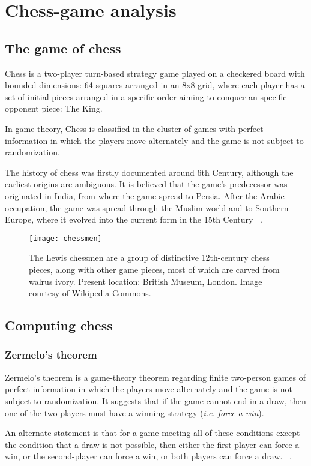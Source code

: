\chapter{Chess-game analysis}

\section{The game of chess}

Chess is a two-player turn-based strategy game played on a checkered board with bounded dimensions: 64 squares arranged in an 8x8 grid, where each player has a set of initial pieces arranged in a specific order aiming to conquer an specific opponent piece: The King.

In game-theory, Chess is classified in the cluster of games with perfect information in which the players move alternately and the game is not subject to randomization.

The history of chess was firstly documented around 6th Century, although the earliest origins are ambiguous. It is believed that the game's predecessor was originated in India, from where the game spread to Persia. After the Arabic occupation, the game was spread through the Muslim world and to Southern Europe, where it evolved into the current form in the 15th Century ~\cite{murray1913history}.


    \begin{figure}[H]
        \centering
        \texttt{[image: chessmen]}
        \caption{The Lewis chessmen are a group of distinctive 12th-century chess pieces, along with other game pieces, most of which are carved from walrus ivory. Present location: British Museum, London. Image courtesy of Wikipedia Commons.}
    \end{figure}

\section{Computing chess}

\subsection{Zermelo's theorem}

\begin{theorem} 
Zermelo's theorem is a game-theory theorem regarding finite two-person games of perfect information in which the players move alternately and the game is not subject to randomization. It suggests that if the game cannot end in a draw, then one of the two players must have a winning strategy (\textit{i.e. force a win}). 

An alternate statement is that for a game meeting all of these conditions except the condition that a draw is not possible, then either the first-player can force a win, or the second-player can force a win, or both players can force a draw. ~\cite{schwalbe2001zermelo}. 
\end{theorem}

